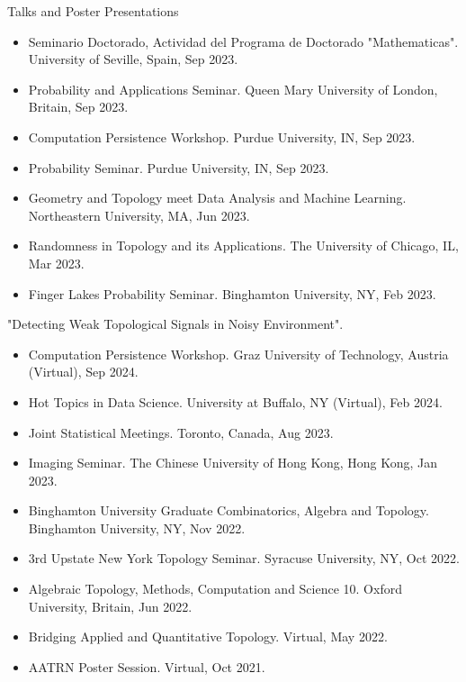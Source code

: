 \documentclass{resume} %
\begin{document}
\begin{rSection}{Talks and Poster Presentations}
\begin{itemize}[noitemsep]
    \item[$\ast$] Seminario Doctorado, Actividad del Programa de Doctorado "Mathematicas". University of Seville, Spain, Sep 2023.
    \item[$\ast$] Probability and Applications Seminar. Queen Mary University of London, Britain, Sep 2023.
    \item Computation Persistence Workshop. Purdue University, IN, Sep 2023.
    \item[$\ast$] Probability Seminar. Purdue University, IN, Sep 2023.
    \item Geometry and Topology meet Data Analysis and Machine Learning. Northeastern University, MA, Jun 2023.
    \item[$\diamond$] Randomness in Topology and its Applications. The University of Chicago, IL, Mar 2023.
    \item Finger Lakes Probability Seminar. Binghamton University, NY, Feb 2023.
\end{itemize}
"Detecting Weak Topological Signals in Noisy Environment".
\begin{itemize}[noitemsep]
    \item Computation Persistence Workshop. Graz University of Technology, Austria (Virtual), Sep 2024.
    \item[$\ast$] Hot Topics in Data Science. University at Buffalo, NY (Virtual), Feb 2024.
    \item Joint Statistical Meetings. Toronto, Canada, Aug 2023.
    \item[$\ast$]Imaging Seminar. The Chinese University of Hong Kong, Hong Kong, Jan 2023.
    \item Binghamton University Graduate Combinatorics, Algebra and Topology. Binghamton University, NY, Nov 2022.
    \item 3rd Upstate New York Topology Seminar. Syracuse University, NY, Oct 2022.
    \item[$\diamond$] Algebraic Topology, Methods, Computation and Science 10. Oxford University, Britain, Jun 2022.
    \item[$\diamond$] Bridging Applied and Quantitative Topology. Virtual, May 2022.
    \item[$\diamond$] AATRN Poster Session. Virtual, Oct 2021.
\end{itemize}
\end{rSection}
\fi



\end{document}
